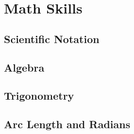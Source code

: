 



\chapter{Math Skills}

\section{Scientific Notation}
\section{Algebra}
\section{Trigonometry}
\section{Arc Length and Radians}